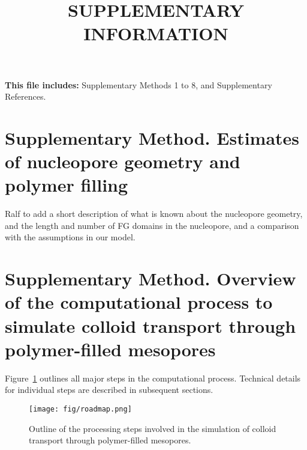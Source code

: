 \documentclass[10pt, a4paper]{article}
\title{SUPPLEMENTARY INFORMATION}
\author{}
\date{}
\begin{document}
\maketitle

\textbf{This file includes:} Supplementary Methods 1 to 8, and Supplementary References.

\pagebreak
\section{Supplementary Method. Estimates of nucleopore geometry and polymer filling}
\begin{multicols}{2}

Ralf to add a short description of what is known about the nucleopore geometry, and the length and number of FG domains in the nucleopore, and a comparison with the assumptions in our model. 

\end{multicols}

\section{Supplementary Method. Overview of the computational process to simulate colloid transport through polymer-filled mesopores}

Figure~\ref{fig:paper_roadmap} outlines all major steps in the computational process. Technical details for individual steps are described in subsequent sections.

\begin{figure}[H]
    \centering
    \texttt{[image: fig/roadmap.png]}
    \caption{Outline of the processing steps involved in the simulation of colloid transport through polymer-filled mesopores.}
    \label{fig:paper_roadmap}
\end{figure}

\end{document}
